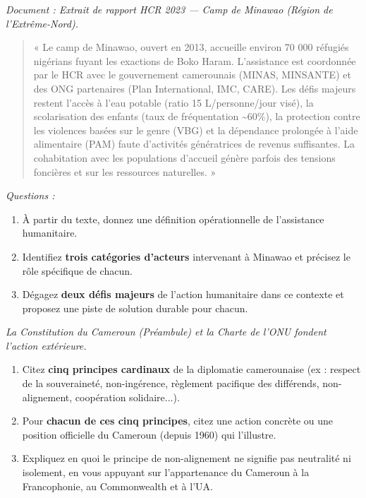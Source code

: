 \documentclass[11pt]{article}
\newcommand{\cle}[1]{{\popxbold\color{popdark}#1}}
\begin{document}
\begin{exercice}
\emph{Document : Extrait de rapport HCR 2023 — Camp de Minawao (Région de l'Extrême-Nord).}
\begin{quote}
« Le camp de Minawao, ouvert en 2013, accueille environ 70 000 réfugiés nigérians fuyant les exactions de Boko Haram. L'assistance est coordonnée par le HCR avec le gouvernement camerounais (MINAS, MINSANTE) et des ONG partenaires (Plan International, IMC, CARE). Les défis majeurs restent l'accès à l'eau potable (ratio 15 L/personne/jour visé), la scolarisation des enfants (taux de fréquentation \textasciitilde 60\%), la protection contre les violences basées sur le genre (VBG) et la dépendance prolongée à l'aide alimentaire (PAM) faute d'activités génératrices de revenus suffisantes. La cohabitation avec les populations d'accueil génère parfois des tensions foncières et sur les ressources naturelles. »
\end{quote}
\emph{Questions :}
\begin{enumerate}
    \item À partir du texte, donnez une définition opérationnelle de l'\cle{assistance humanitaire}.
    \item Identifiez \textbf{trois catégories d'acteurs} intervenant à Minawao et précisez le rôle spécifique de chacun.
    \item Dégagez \textbf{deux défis majeurs} de l'action humanitaire dans ce contexte et proposez une piste de solution durable pour chacun.
\end{enumerate}
\end{exercice}

\begin{exercice}
\emph{La Constitution du Cameroun (Préambule) et la Charte de l'ONU fondent l'action extérieure.}
\begin{enumerate}
    \item Citez \textbf{cinq principes cardinaux} de la diplomatie camerounaise (ex : respect de la souveraineté, non-ingérence, règlement pacifique des différends, non-alignement, coopération solidaire...).
    \item Pour \textbf{chacun de ces cinq principes}, citez une action concrète ou une position officielle du Cameroun (depuis 1960) qui l'illustre.
    \item Expliquez en quoi le principe de \cle{non-alignement} ne signifie pas \cle{neutralité} ni \cle{isolement}, en vous appuyant sur l'appartenance du Cameroun à la Francophonie, au Commonwealth et à l'UA.
\end{enumerate}
\end{exercice}
\end{document}
